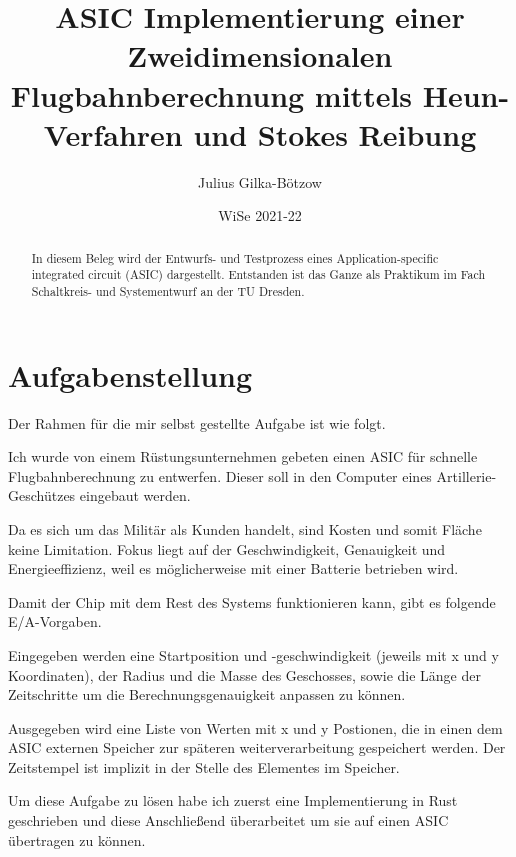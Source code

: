 \documentclass{artilcle}
\title{ASIC Implementierung einer Zweidimensionalen Flugbahnberechnung mittels Heun-Verfahren und Stokes Reibung}
\author{Julius Gilka-Bötzow}
\date{WiSe 2021-22}
\begin{document}
    \begin{titlepage}
        \maketitle
    \end{titlepage}

    \begin{abstract}
        In diesem Beleg wird der Entwurfs- und Testprozess eines Application-specific integrated circuit (ASIC)
        dargestellt. Entstanden ist das Ganze als Praktikum im Fach Schaltkreis- und Systementwurf an der TU Dresden.
    \end{abstract}


    \newpage
    \tableofcontents
    \newpage


    \section{Aufgabenstellung}

    Der Rahmen für die mir selbst gestellte Aufgabe ist wie folgt.

    Ich wurde von einem Rüstungsunternehmen gebeten einen ASIC für schnelle Flugbahnberechnung zu entwerfen.
    Dieser soll in den Computer eines Artillerie-Geschützes eingebaut werden.

    \newblock

    Da es sich um das Militär als Kunden handelt, sind Kosten und somit Fläche keine Limitation.
    Fokus liegt auf der Geschwindigkeit, Genauigkeit und Energieeffizienz, weil es möglicherweise mit einer
    Batterie betrieben wird.

    \newblock

    Damit der Chip mit dem Rest des Systems funktionieren kann, gibt es folgende E/A-Vorgaben.

    Eingegeben werden eine Startposition und -geschwindigkeit (jeweils mit x und y Koordinaten), der Radius
    und die Masse des Geschosses, sowie die Länge der Zeitschritte um die Berechnungsgenauigkeit anpassen zu können.

    Ausgegeben wird eine Liste von Werten mit x und y Postionen, die in einen dem ASIC externen Speicher zur späteren
    weiterverarbeitung gespeichert werden. Der Zeitstempel ist implizit in der Stelle des
    Elementes im Speicher.

    \newblock

    Um diese Aufgabe zu lösen habe ich zuerst eine Implementierung in Rust geschrieben und diese Anschließend
    überarbeitet um sie auf einen ASIC übertragen zu können.
\end{document}
